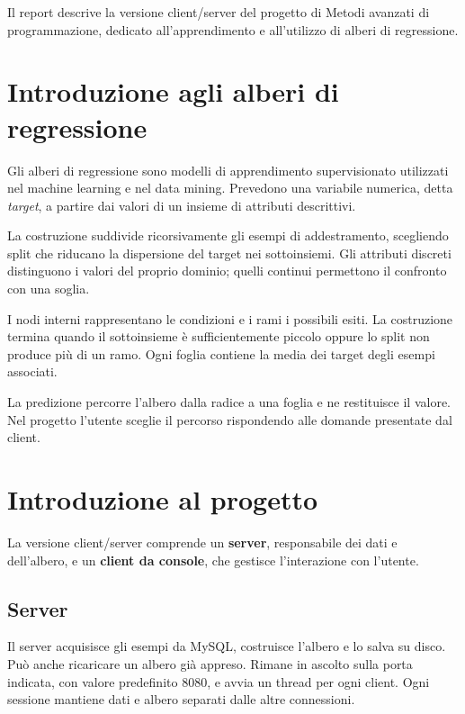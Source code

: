\documentclass[11pt,a4paper]{article}
\begin{document}

Il report descrive la versione client/server del progetto di Metodi avanzati
di programmazione, dedicato all'apprendimento e all'utilizzo di alberi di
regressione.

\section*{Introduzione agli alberi di regressione}

Gli alberi di regressione sono modelli di apprendimento supervisionato utilizzati
nel machine learning e nel data mining. Prevedono una variabile numerica, detta
\emph{target}, a partire dai valori di un insieme di attributi descrittivi.

La costruzione suddivide ricorsivamente gli esempi di addestramento, scegliendo
split che riducano la dispersione del target nei sottoinsiemi. Gli attributi
discreti distinguono i valori del proprio dominio; quelli continui permettono
il confronto con una soglia.

I nodi interni rappresentano le condizioni e i rami i possibili esiti. La
costruzione termina quando il sottoinsieme è sufficientemente piccolo oppure
lo split non produce più di un ramo. Ogni foglia contiene la media dei target
degli esempi associati.

La predizione percorre l'albero dalla radice a una foglia e ne restituisce il
valore. Nel progetto l'utente sceglie il percorso rispondendo alle domande
presentate dal client.

\section*{Introduzione al progetto}

La versione client/server comprende un \textbf{server}, responsabile dei dati e
dell'albero, e un \textbf{client da console}, che gestisce l'interazione con
l'utente.

\subsection*{Server}

Il server acquisisce gli esempi da MySQL, costruisce l'albero e lo salva su disco.
Può anche ricaricare un albero già appreso. Rimane in ascolto sulla porta indicata,
con valore predefinito 8080, e avvia un thread per ogni client. Ogni sessione
mantiene dati e albero separati dalle altre connessioni.
\end{document}
